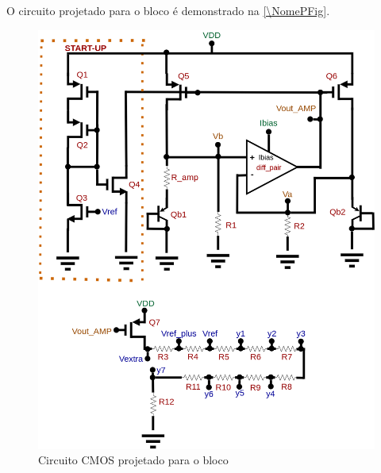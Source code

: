 O circuito projetado para o bloco \'e demonstrado na \autoref{\NomePFig}.

\begin{figure}[htb]
 \label{\NomePFig}
 \centering
    \centering
    \caption{Circuito CMOS projetado para o bloco \NomeBloco} 
    \includegraphics[scale=0.3]{Circuitos/vref_generator.png}
\end{figure}

